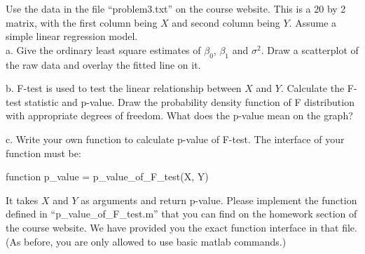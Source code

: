 \documentclass[12pt]{article}
\begin{document}
 {
  Use the data in the file ``problem3.txt'' on the course website. This is a 20 by 2 matrix, with the first column being $X$ and second column being $Y$. Assume a simple linear regression model.\\
 a. Give the ordinary least square estimates of $\beta_0$, $\beta_1$ and $\sigma^2$. Draw a scatterplot of the raw data and overlay the fitted line on it.

 b. F-test is used to test the linear relationship between $X$ and $Y$. Calculate the F-test statistic and p-value. Draw the probability density function of F distribution with appropriate degrees of freedom. What does the p-value mean on the graph?

 c. Write your own function to calculate p-value of F-test. The interface of your function must be:

\begin{center}
function p\_value = p\_value\_of\_F\_test(X, Y)
\end{center}

It takes $X$ and $Y$ as arguments and return p-value. Please implement the function defined in ``p\_value\_of\_F\_test.m'' that you can find on the homework section of the course website. We have provided you the exact function interface in that file. (As before, you are only allowed to use basic matlab commands.)
}
 { \vfill
  \ANSWER
} {}




\problemsdone
\end{document}
